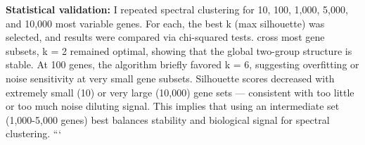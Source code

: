 \documentclass[
]{article}
\begin{document}
\textbf{Statistical validation:} I repeated spectral clustering for 10,
100, 1,000, 5,000, and 10,000 most variable genes. For each, the best k
(max silhouette) was selected, and results were compared via chi-squared
tests. cross most gene subsets, k = 2 remained optimal, showing that the
global two-group structure is stable. At 100 genes, the algorithm
briefly favored k = 6, suggesting overfitting or noise sensitivity at
very small gene subsets. Silhouette scores decreased with extremely
small (10) or very large (10,000) gene sets --- consistent with too
little or too much noise diluting signal. This implies that using an
intermediate set (1,000-5,000 genes) best balances stability and
biological signal for spectral clustering. ```
\end{document}
